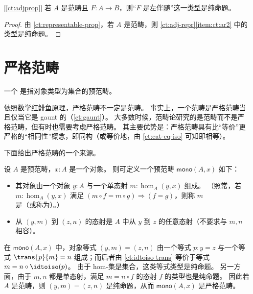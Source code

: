 \begin{cor}\label{ct:adjprop2}[\cref{ct:adjprop}]
  若 $A$ 是范畴且 $F:A\to B$，则“$F$ 是左伴随”这一类型是纯命题。
\end{cor}
\begin{proof}
  由 \cref{ct:representable-prop}，若 $A$ 是范畴，则 \cref{ct:adj-repr}\ref{item:ct:ar2} 中的类型是纯命题。
\end{proof}

\section{严格范畴}
\label{sec:strict-categories}

%

\begin{defn}\label{ct:strict-category}
  一个
  是指对象类型为集合的预范畴。
\end{defn}

依照数学红鲱鱼原理，严格范畴不一定是范畴。
事实上，一个范畴是严格范畴当且仅当它是 gaunt 的（\cref{ct:gaunt}）。
%
%
大多数时候，范畴论研究的是范畴而不是严格范畴，但有时也需要考虑严格范畴。
其主要优势是：严格范畴具有比“等价”更严格的“相同性”概念，即同构（或等价地，由 \cref{ct:cat-eq-iso} 可知即相等）。

下面给出严格范畴的一个来源。

\begin{eg}\label{ct:mono-cat}
  设 $A$ 是预范畴，$x:A$ 是一个对象。
  则可定义一个预范畴 $\mathsf{mono}(A,x)$ 如下：
  \begin{itemize}
  \item 其对象由一个对象 $y:A$ 与一个单态射 $m:\hom_A(y,x)$ 组成。
    （照常，若 $m:\hom_A(y,x)$ 满足 $(m\circ f = m\circ g) \Rightarrow (f=g)$，则称 $m$ 是（或称为）。）
  \item 从 $(y,m)$ 到 $(z,n)$ 的态射是 $A$ 中从 $y$ 到 $z$ 的任意态射（不要求与 $m,n$ 相容）。
  \end{itemize}
  在 $\mathsf{mono}(A,x)$ 中，对象等式 $(y,m)=(z,n)$ 由一个等式 $p:y=z$ 与一个等式 $\trans{p}{m}=n$ 组成；而后者由 \cref{ct:idtoiso-trans} 等价于等式 $m=n\circ \idtoiso(p)$。
  由于 hom-集是集合，这类等式类型是纯命题。
  另一方面，由于 $m,n$ 都是单态射，满足 $m = n\circ f$ 的态射 $f$ 的类型也是纯命题。
  因此若 $A$ 是范畴，则 $(y,m)=(z,n)$ 是纯命题，从而 $\mathsf{mono}(A,x)$ 是严格范畴。
\end{eg}

